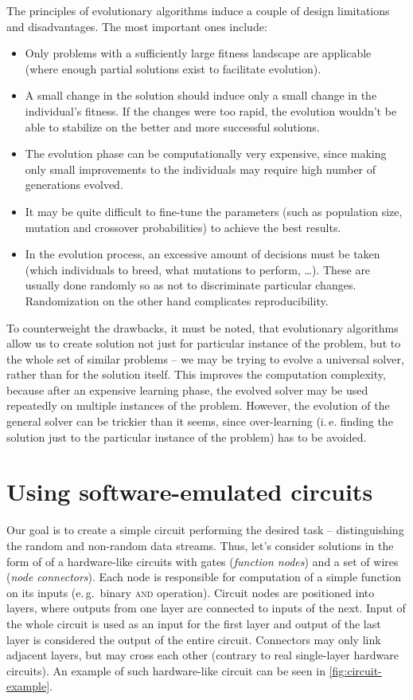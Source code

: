\documentclass[12pt,oneside]{fithesis2}		%
\renewcommand{\_}{\leavevmode \kern0.0em\vbox{\hrule width0.4em}}
\newcommand{\squarebullet}{\textcolor{black}{\raisebox{0.15em}{\rule{4pt}{4pt}}}}
\newenvironment{myItemize}{
  \begin{itemize}[leftmargin=2em,rightmargin=1em,itemsep=\parskip ,parsep=0em,topsep=0em,partopsep=0em]
  \renewcommand{\labelitemi}{\squarebullet}
  \renewcommand{\labelitemii}{$\diamond$}
}{
  \end{itemize}
}
\begin{document}
\noindent
The principles of evolutionary algorithms induce a couple of design limitations and disadvantages. 
The most important ones include:
\begin{myItemize}
\item Only problems with a sufficiently large fitness landscape are applicable (where enough partial solutions exist to facilitate
evolution).
\item A small change in the solution should induce only a small change in the individual's fitness. If the changes were
too rapid, the evolution wouldn't be able to stabilize on the better and more successful solutions.
\item The evolution phase can be computationally very expensive, since making only small improvements to the individuals may require
high number of generations evolved.
\item It may be quite difficult to fine-tune the parameters (such as population size, mutation and crossover probabilities)
to achieve the best results.
\item In the evolution process, an excessive amount of decisions must be taken (which individuals to breed, 
what mutations to perform, \dots). These are usually done randomly so as not to discriminate particular changes.
Randomization on the other hand complicates reproducibility.
\end{myItemize}

\noindent
To counterweight the drawbacks, it must be noted, that evolutionary algorithms allow us to create solution not just for particular
instance of the problem, but to the whole set of similar problems -- we may be trying to evolve a universal solver, 
rather than for the solution itself. 
This improves the computation complexity, because after an expensive learning phase, the evolved solver may be used
repeatedly on multiple instances of the problem. However, the evolution of the general solver can be trickier than it seems,
since over-learning (i.\,e. finding the solution just to the particular instance of the problem) has to be avoided.

\section{Using software-emulated circuits}
\label{sec:sw-circuits}

Our goal is to create a simple circuit performing the desired task -- distinguishing the random and non-random data streams.
Thus, let's consider solutions in the form of of a hardware-like circuits with gates (\textit{function nodes}) 
and a set of wires (\textit{node connectors}).
Each node is responsible for computation of a simple function on its inputs (e.\,g.\ binary \textsc{and} operation).
Circuit nodes are positioned into layers, where outputs from one layer are connected to inputs of the next. Input of the whole
circuit is used as an input for the first layer and output of the last layer is considered the output of the entire circuit.
Connectors may only link adjacent layers, but may cross each other (contrary to real single-layer hardware circuits).
An example of such hardware-like circuit can be seen in \autoref{fig:circuit-example}.
\end{document}
